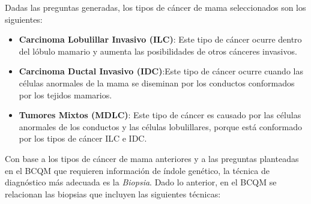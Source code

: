 Dadas las preguntas generadas, los tipos de cáncer de mama seleccionados son los siguientes:
\begin{itemize}[label=\HandRight]
	\item \textbf{Carcinoma Lobulillar Invasivo (ILC)}:  Este tipo de cáncer ocurre dentro del lóbulo mamario y aumenta las posibilidades de otros cánceres invasivos. 
	\item \textbf{Carcinoma Ductal Invasivo (IDC)}:Este tipo de cáncer ocurre cuando las células anormales de la mama se diseminan por los conductos conformados por los tejidos mamarios.
	\item \textbf{Tumores Mixtos (MDLC)}: Este tipo de cáncer es causado por las células anormales de los conductos y las células lobulillares, porque está conformado por los tipos de cáncer ILC e IDC.
\end{itemize}

Con base a los tipos de cáncer de mama anteriores y a las preguntas planteadas en el BCQM que requieren información de índole genético, la técnica de diagnóstico más adecuada es la \textit{Biopsia}. Dado lo anterior, en el BCQM se relacionan las biopsias que incluyen las siguientes técnicas: 

